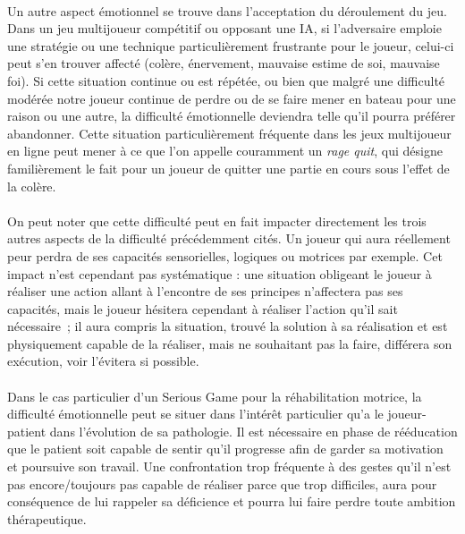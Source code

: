 \paragraph{}
Un autre aspect émotionnel se trouve dans l’acceptation du déroulement du jeu. Dans un jeu multijoueur compétitif ou opposant une IA, si l’adversaire emploie une stratégie ou une technique particulièrement frustrante pour le joueur, celui-ci peut s’en trouver affecté (colère, énervement, mauvaise estime de soi, mauvaise foi). Si cette situation continue ou est répétée, ou bien que malgré une difficulté modérée notre joueur continue de perdre ou de se faire mener en bateau pour une raison ou une autre, la difficulté émotionnelle deviendra telle qu’il pourra préférer abandonner. Cette situation particulièrement fréquente dans les jeux multijoueur en ligne peut mener à ce que l’on appelle couramment un \emph{rage quit}, qui désigne familièrement le fait pour un joueur de quitter une partie en cours sous l'effet de la colère.

\paragraph{}On peut noter que cette difficulté peut en fait impacter directement les trois autres aspects de la difficulté précédemment cités. Un joueur qui aura réellement peur perdra de ses capacités sensorielles, logiques ou motrices par exemple. Cet impact n’est cependant pas systématique : une situation obligeant le joueur à réaliser une action allant à l’encontre de ses principes n’affectera pas ses capacités, mais le joueur hésitera cependant à réaliser l’action qu’il sait nécessaire~; il aura compris la situation, trouvé la solution à sa réalisation et est physiquement capable de la réaliser, mais ne souhaitant pas la faire, différera son exécution, voir l’évitera si possible.

\paragraph{}Dans le cas particulier d’un Serious Game pour la réhabilitation motrice, la difficulté émotionnelle peut se situer dans l’intérêt particulier qu’a le joueur-patient dans l’évolution de sa pathologie. Il est nécessaire en phase de rééducation que le patient soit capable de sentir qu’il progresse afin de garder sa motivation et poursuive son travail. Une confrontation trop fréquente à des gestes qu’il n’est pas encore/toujours pas capable de réaliser parce que trop difficiles, aura pour conséquence de lui rappeler sa déficience et pourra lui faire perdre toute ambition thérapeutique.

